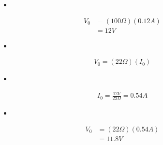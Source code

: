 \begin{itemize}
\item {\bfseries\itshape\color{Violet}{Substituting ( 19 ) in ( 18 ):}} \hfill \break
\end{itemize}

\begin{ceqn}
\begin{align}
V_{0} &= ( 100\Omega )( 0.12A ) \\
&= 12 V 
\end{align}
\end{ceqn} \hfill

\pagebreak

\begin{itemize}
\item {\bfseries\itshape{}} \hfill \break
{\bfseries\itshape\color{Brown}{
\begin{tasks}
\task Using Ohm's Law: $V$ = $(\ I\ )(\ R\ )$. \hfill \break
\end{tasks}}}
\end{itemize}

\begin{ceqn}
\begin{align}
V_{0} = ( 22\Omega )( I_{0} )
\end{align}
\end{ceqn} \hfill

\begin{itemize}
\item {\bfseries\itshape{}} \hfill \break
\end{itemize}

\begin{ceqn}
\begin{align}
I_{0} = \frac{12V}{22\Omega} = 0.54 A
\end{align}
\end{ceqn} \hfill

\begin{itemize}
\item {\bfseries\itshape\color{Violet}{Substituting ( 23 ) in ( 22 ):}} \hfill \break
\end{itemize}

\begin{ceqn}
\begin{align}
V_{0} &= ( 22\Omega )( 0.54A ) \\
&= 11.8 V 
\end{align}
\end{ceqn} \hfill

\pagebreak